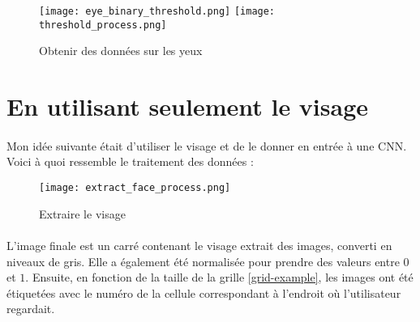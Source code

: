 \begin{figure}[H]
    \centering
    \texttt{[image: eye\_binary\_threshold.png]}
    \texttt{[image: threshold\_process.png]}
    \caption{Obtenir des données sur les yeux}
\end{figure}

\section{En utilisant seulement le visage}
\paragraph{}
Mon idée suivante était d'utiliser le visage et de le donner en entrée à une CNN.
Voici à quoi ressemble le traitement des données :
\begin{figure}[H]
    \centering
    \texttt{[image: extract\_face\_process.png]}
    \caption{Extraire le visage}
    \label{fig_extracted_faces}
\end{figure}

\paragraph{}

L'image finale est un carré contenant le visage extrait des images, converti en niveaux de gris.
Elle a également été normalisée pour prendre des valeurs entre $0$ et $1$.
Ensuite, en fonction de la taille de la grille \ref{grid-example}, les images ont été étiquetées avec le numéro de la cellule correspondant à l'endroit où l'utilisateur regardait.

